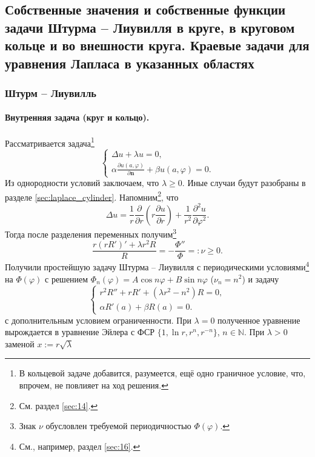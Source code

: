 \subsection{Собственные значения и собственные функции задачи Штурма -- Лиувилля
в круге, в круговом кольце и во внешности круга. Краевые задачи для уравнения
Лапласа в указанных областях}\label{sec:20}
\subsubsection{Штурм -- Лиувилль}
\paragraph{Внутренняя задача (круг и кольцо).}
Рассматривается задача\footnote{В кольцевой задаче добавится, разумеется, ещё
одно граничное условие, что, впрочем, не повлияет на ход решения.}
\[
  \begin{cases}
    \Delta u + \lambda u = 0,\\
    \alpha \frac{\partial u(a, \varphi)}{\partial \mathbf n} + \beta u(a, \varphi) = 0.
  \end{cases}
\]
Из однородности условий заключаем, что $ \lambda \geqslant 0 $. Иные случаи будут разобраны в разделе
\ref{sec:laplace_cylinder}. Напомним\footnote{См. раздел \ref{sec:14}.}, что  
\[
    \Delta u = \frac{1}{r} \frac{\partial}{\partial r} \left( r \frac{\partial
    u}{\partial r} \right) + \frac{1}{r^2} \frac{\partial^2 u}{\partial
  \varphi^2}.
\]
Тогда после разделения переменных получим\footnote{Знак $ \nu $ обусловлен
требуемой периодичностью $ \Phi(\varphi) $.}
\[
    \frac{r (r R')' + \lambda r^2 R}{R} = - \frac{\Phi''}{\Phi} =: \nu \geqslant
    0.
\]
Получили простейшую задачу Штурма -- Лиувилля с периодическими
условиями\footnote{См., например, раздел \ref{sec:16}.}
на $ \Phi(\varphi) $ с решением $ \Phi_n(\varphi) = A\cos n\varphi + B\sin
n\varphi $ ($ \nu_n = n^2 $) и задачу
\begin{equation}
  \label{eq:bessel_eq}
  \begin{cases}
    r^2R'' + rR' + (\lambda r^2 - n^2) R = 0,\\
    \alpha R'(a) + \beta R(a) = 0.
  \end{cases}
\end{equation}
с дополнительным условием ограниченности. При $ \lambda = 0 $ полученное
уравнение вырождается в уравнение Эйлера с ФСР $ \{1, \ln r , r^n, r^{-n}\}$, $n
\in \mathbb N$. При $ \lambda > 0 $ заменой $ x := r\sqrt\lambda $
